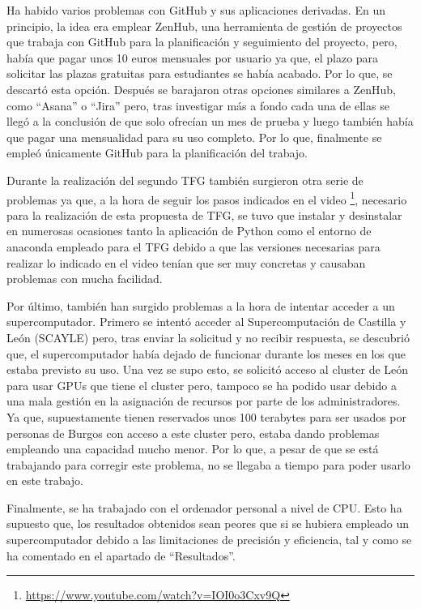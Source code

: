 Ha habido varios problemas con GitHub y sus aplicaciones derivadas. En un principio, la idea era emplear ZenHub, una herramienta de gestión de proyectos que trabaja con GitHub para la planificación y seguimiento del proyecto, pero, había que pagar unos 10 euros mensuales por usuario ya que, el plazo para solicitar las plazas gratuitas para estudiantes se había acabado. Por lo que, se descartó esta opción. Después se barajaron otras opciones similares a ZenHub, como ``Asana'' o ``Jira'' pero, tras investigar más a fondo cada una de ellas se llegó a la conclusión de que solo ofrecían un mes de prueba y luego también había que pagar una mensualidad para su uso completo. Por lo que, finalmente se empleó únicamente GitHub para la planificación del trabajo.

Durante la realización del segundo TFG también surgieron otra serie de problemas ya que, a la hora de seguir los pasos indicados en el video \footnote{\url{https://www.youtube.com/watch?v=IOI0o3Cxv9Q}}, necesario para la realización de esta propuesta de TFG, se tuvo que instalar y desinstalar en numerosas ocasiones tanto la aplicación de Python como el entorno de anaconda empleado para el TFG debido a que las versiones necesarias para realizar lo indicado en el video tenían que ser muy concretas y causaban problemas con mucha facilidad.

Por último, también han surgido problemas a la hora de intentar acceder a un supercomputador. Primero se intentó acceder al Supercomputación de Castilla y León (SCAYLE) pero, tras enviar la solicitud y no recibir respuesta, se descubrió que, el supercomputador había dejado de funcionar durante los meses en los que estaba previsto su uso. Una vez se supo esto, se solicitó acceso al cluster de León para usar GPUs que tiene el cluster pero, tampoco se ha podido usar debido a una mala gestión en la asignación de recursos por parte de los administradores. Ya que, supuestamente tienen reservados unos 100 terabytes para ser usados por personas de Burgos con acceso a este cluster pero, estaba dando problemas empleando una capacidad mucho menor. Por lo que, a pesar de que se está trabajando para corregir este problema, no se llegaba a tiempo para poder usarlo en este trabajo. 

Finalmente, se ha trabajado con el ordenador personal a nivel de CPU. Esto ha supuesto que, los resultados obtenidos sean peores que si se hubiera empleado un supercomputador debido a las limitaciones de precisión y eficiencia, tal y como se ha comentado en el apartado de ``Resultados''.








